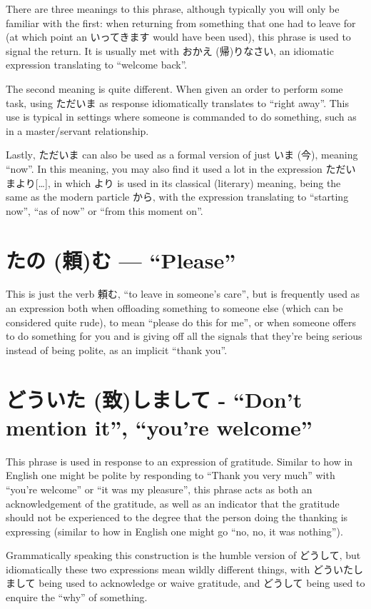 \documentclass[11pt, b5paper, twoside, openright, onecolumn]{book}
\makeatletter
\newcommand*{\rubystack}[2]{{\relscale{0.5}%
  \begin{tabular}[b]{@{}c@{}}%
    {#1}\\%
   {\textscale{2}{#2}}%
  \end{tabular}}%
}
\DeclareRobustCommand*{\ruby}[2]{%
  \mbox{%
    \setlength{\parskip}{0ex}%
    \BeginAccSupp{method=pdfstringdef,ActualText={#1}}%
      \rubystack{\phantom{#2}}{#1}%
      \llap{%
        \rubystack{#2}{\phantom{#1}}%
      }%
    \EndAccSupp{}%
  }%
}
\renewcommand*{\ruby}[2]{#2 (#1)}%
\makeatother
\begin{document}
There are three meanings to this phrase‚ although typically you will only be familiar with the first: when returning from something that one had to leave for (at which point an いってきます would have been used)‚ this phrase is used to signal the return. It is usually met with お\ruby{帰}{かえ}りなさい‚ an idiomatic expression translating to “welcome back”. 

The second meaning is quite different. When given an order to perform some task‚ using ただいま as response idiomatically translates to “right away”. This use is typical in settings where someone is commanded to do something‚ such as in a master/servant relationship.

Lastly‚ ただいま can also be used as a formal version of just \ruby{今}{いま}‚ meaning “now”. In this meaning‚ you may also find it used a lot in the expression ただいまより[…]‚ in which より is used in its classical (literary) meaning‚ being the same as the modern particle から‚ with the expression translating to “starting now”‚ “as of now” or “from this moment on”.

\section*{\ruby{頼}{たの}む — “Please”}

This is just the verb 頼む‚ “to leave in someone’s care”‚ but is frequently used as an expression both when offloading something to someone else (which can be considered quite rude)‚ to mean “please do this for me”‚ or when someone offers to do something for you and is giving off all the signals that they’re being serious instead of being polite‚ as an implicit “thank you”.

\section*{どう\ruby{致}{いた}しまして - “Don’t mention it”‚ “you’re welcome”}

This phrase is used in response to an expression of gratitude. Similar to how in English one might be polite by responding to “Thank you very much” with “you’re welcome” or “it was my pleasure”‚ this phrase acts as both an acknowledgement of the gratitude‚ as well as an indicator that the gratitude should not be experienced to the degree that the person doing the thanking is expressing (similar to how in English one might go “no‚ no‚ it was nothing”).

Grammatically speaking this construction is the humble version of どうして‚ but idiomatically these two expressions mean wildly different things‚ with どういたしまして being used to acknowledge or waive gratitude‚ and どうして being used to enquire the “why” of something.
\end{document}
